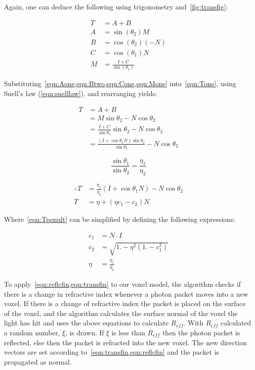 \begin{appendices}
Again, one can deduce the following using trigonometry and~\cref{fig:transfig}:

\begin{align}
T&=A+B\label{eqn:Tone}\\
A&=\sin\left(\theta_2\right) M\label{eqn:Aone}\\
B&=\cos\left(\theta_2\right)(-N)\label{eqn:Btwo}\\
C&=\cos\left(\theta_1\right)N\label{eqn:Cone}\\
M&=\frac{I+C}{\sin\left(\theta_1\right)}\label{eqn:Mone}
\end{align}

Substituting~\cref{eqn:Aone,eqn:Btwo,eqn:Cone,eqn:Mone} into~\cref{eqn:Tone}, using Snell's law (\cref{eqn:snelllaw}), and rearranging yields:

\begin{align}
T&=A+B\\
&=M\sin\theta_2-N\cos\theta_2\\
&=\frac{I+C}{\sin\theta_1}\sin\theta_2-N\cos\theta_2\\
&=\frac{(I+\cos\theta_1 N)\sin\theta_2}{\sin\theta_1}-N\cos\theta_2
\end{align}

\begin{equation}
\frac{\sin\theta_1}{\sin\theta_2}=\frac{\eta_1}{\eta_2}\label{eqn:snelllaw}
\end{equation}

\begin{align}
\therefore T&=\frac{\eta_1}{\eta_2}\left(I+\cos\theta_1 N\right)-N\cos\theta_2\label{eqn:Tpenult}\\
T&=\eta+\left(\eta c_1-c_2\right)N\label{eqn:transfin}
\end{align}

Where~\cref{eqn:Tpenult} can be simplified by defining the following expressions:

\begin{align}
c_1 &= N \cdot I\label{eqn:c1}\\
c_2 &= \sqrt{1. - \eta^2 (1. - c_1^2)}\label{eqn:c2}\\
\eta&=\frac{\eta_1}{\eta_2}
\end{align}


To apply~\cref{eqn:reflcfin,eqn:transfin} to our voxel model, the algorithm checks if there is a change in refractive index whenever a photon packet moves into a new voxel.
If there is a change of refractive index the packet is placed on the surface of the voxel, and the algorithm calculates the surface normal of the voxel the light has hit and uses the above equations to calculate $R_{eff}$.
With $R_{eff}$ calculated a random number, $\xi$, is drawn.
If $\xi$ is less than $R_{eff}$ then the photon packet is reflected, else then the packet is refracted into the new voxel.
The new direction vectors are set according to~\cref{eqn:transfin,eqn:reflcfin} and the packet is propagated as normal.


\end{appendices}
